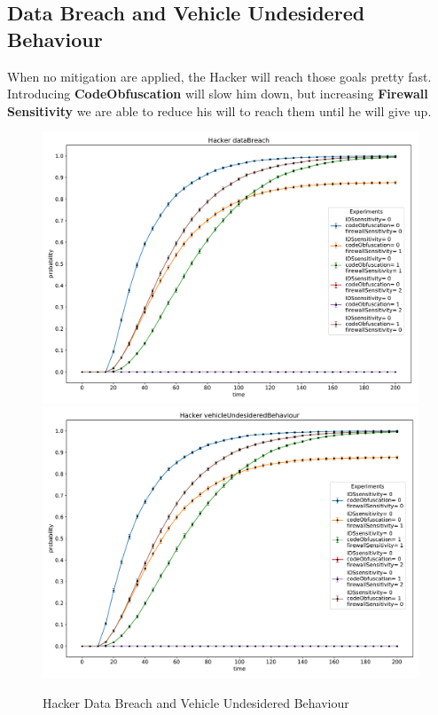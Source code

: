 \subsection*{Data Breach and Vehicle Undesidered Behaviour}
When no mitigation are applied, the Hacker will reach those goals pretty fast. Introducing \textbf{CodeObfuscation}
will slow him down, but increasing \textbf{Firewall Sensitivity} we are able to reduce his will to reach them
until he will give up. 
\begin{figure}[H]
    \begin{center}
        \includegraphics[scale=0.4]{img/Hacker_dataBreach.pdf}
        \includegraphics[scale=0.4]{img/Hacker_vOB.pdf}
    \end{center}
    \caption{Hacker Data Breach and Vehicle Undesidered Behaviour}
    \label{fig:Hacker_dataBreach}
    \vspace*{-2cm}
\end{figure}
